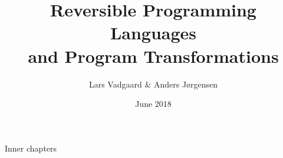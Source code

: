 \documentclass[12pt,twoside,openright,pdftex]{report}
\begin{document}
\title{%
  Reversible Programming Languages\\
  and Program Transformations
}%
\author{Lars Vadgaard \& Anders Jørgensen}
\date{June 2018}%


\maketitle
\clearpage\maketitle
\thispagestyle{empty}
\newpage
\setcounter{page}{1}



\tableofcontents

 Inner chapters








\newpage
\printbibliography[heading=bibintoc,title={References}]
\end{document}

